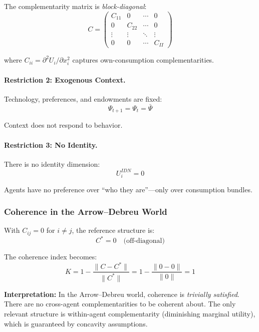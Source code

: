 The complementarity matrix is \emph{block-diagonal}:
\begin{equation}
  C = \begin{pmatrix}
    C_{11} & 0 & \cdots & 0 \\
    0 & C_{22} & \cdots & 0 \\
    \vdots & \vdots & \ddots & \vdots \\
    0 & 0 & \cdots & C_{II}
  \end{pmatrix}
\end{equation}

where $C_{ii} = \partial^2 U_i / \partial x_i^2$ captures own-consumption complementarities.

\paragraph{Restriction 2: Exogenous Context.}
Technology, preferences, and endowments are fixed:
\begin{equation}
  \Psi_{t+1} = \Psi_t = \bar{\Psi}
  \label{eq:adexogenous}
\end{equation}

Context does not respond to behavior.

\paragraph{Restriction 3: No Identity.}
There is no identity dimension:
\begin{equation}
  U_i^{IDN} = 0
\end{equation}

Agents have no preference over ``who they are''---only over consumption bundles.

\subsubsection{Coherence in the Arrow--Debreu World}

With $C_{ij} = 0$ for $i \neq j$, the reference structure is:
\begin{equation}
  C^* = 0 \quad \text{(off-diagonal)}
\end{equation}

The coherence index becomes:
\begin{equation}
  K = 1 - \frac{\|C - C^*\|}{\|C^*\|} = 1 - \frac{\|0 - 0\|}{\|0\|} = 1
\end{equation}

\textbf{Interpretation:} In the Arrow--Debreu world, coherence is \emph{trivially satisfied}.
There are no cross-agent complementarities to be coherent about.
The only relevant structure is within-agent complementarity (diminishing marginal utility),
which is guaranteed by concavity assumptions.

